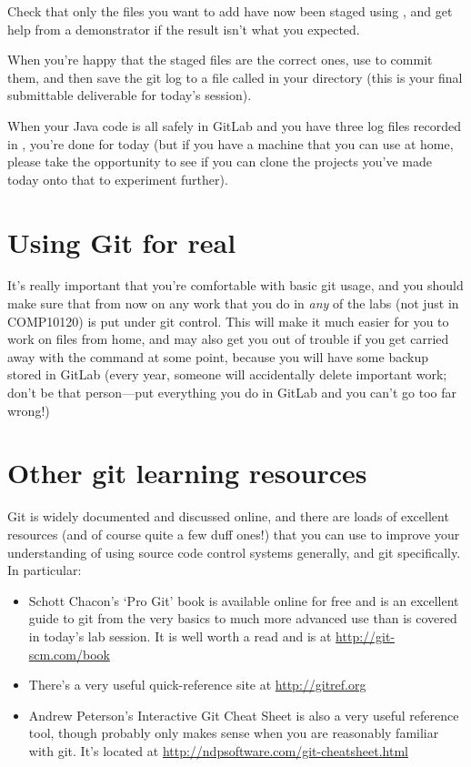 Check that only the files you want to add have now been staged using , and get help from a demonstrator if the result isn't what you expected.

When you're happy that the staged files are the correct ones, use  to commit them, and then save the git log to a file called  in your  directory (this is your final submittable deliverable for today's session). 

When your Java code is all safely in GitLab and you have three log files recorded in , you're done for today (but if you have a machine that you can use at home, please take the opportunity to see if you can clone the projects you've made today onto that to experiment further). 


\section{Using Git for real}

It's really important that you're comfortable with basic git usage, and you should make sure that from now on any work that you do in \emph{any} of the labs (not just in COMP10120) is put under git control. This will make it much easier for you to work on files from home, and may also get you out of trouble if you get carried away with the  command at some point, because you will have some backup stored in GitLab (every year, someone will accidentally delete important work; don't be that person---put everything you do in GitLab and you can't go too far wrong!)

\section{Other git learning resources}

Git is widely documented and discussed online, and there are loads of excellent resources (and of course quite a few duff ones!) that you can use to improve your understanding of using source code control systems generally, and git specifically. In particular:

\begin{itemize}

\item Schott Chacon's `Pro Git' book is available online for free and is an excellent guide to git from the very basics to much more advanced use than is covered in today's lab session. It is well worth a read and is at \url{http://git-scm.com/book}

\item There's a very useful quick-reference site at \url{http://gitref.org}

\item Andrew Peterson's Interactive Git Cheat Sheet is also a very useful reference tool, though probably only makes sense when you are reasonably familiar with git. It's located at \url{http://ndpsoftware.com/git-cheatsheet.html}
\end{itemize}

